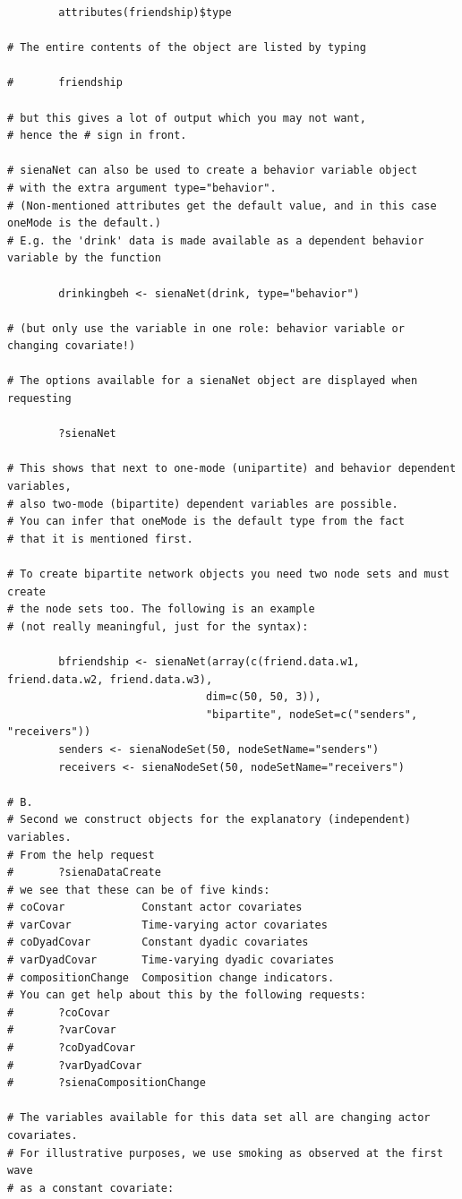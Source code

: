 \documentclass[a4paper,fleqn]{article}
\newcommand{\+}{\, + \,}
\begin{document}
{\begin{verbatim}
        attributes(friendship)$type

# The entire contents of the object are listed by typing

#       friendship

# but this gives a lot of output which you may not want,
# hence the # sign in front.

# sienaNet can also be used to create a behavior variable object
# with the extra argument type="behavior".
# (Non-mentioned attributes get the default value, and in this case oneMode is the default.)
# E.g. the 'drink' data is made available as a dependent behavior variable by the function

        drinkingbeh <- sienaNet(drink, type="behavior")

# (but only use the variable in one role: behavior variable or changing covariate!)

# The options available for a sienaNet object are displayed when requesting

        ?sienaNet

# This shows that next to one-mode (unipartite) and behavior dependent variables,
# also two-mode (bipartite) dependent variables are possible.
# You can infer that oneMode is the default type from the fact
# that it is mentioned first.

# To create bipartite network objects you need two node sets and must create
# the node sets too. The following is an example
# (not really meaningful, just for the syntax):

        bfriendship <- sienaNet(array(c(friend.data.w1, friend.data.w2, friend.data.w3),
                               dim=c(50, 50, 3)),
                               "bipartite", nodeSet=c("senders", "receivers"))
        senders <- sienaNodeSet(50, nodeSetName="senders")
        receivers <- sienaNodeSet(50, nodeSetName="receivers")

# B.
# Second we construct objects for the explanatory (independent) variables.
# From the help request
#       ?sienaDataCreate
# we see that these can be of five kinds:
# coCovar            Constant actor covariates
# varCovar           Time-varying actor covariates
# coDyadCovar        Constant dyadic covariates
# varDyadCovar       Time-varying dyadic covariates
# compositionChange  Composition change indicators.
# You can get help about this by the following requests:
#       ?coCovar
#       ?varCovar
#       ?coDyadCovar
#       ?varDyadCovar
#       ?sienaCompositionChange

# The variables available for this data set all are changing actor covariates.
# For illustrative purposes, we use smoking as observed at the first wave
# as a constant covariate:


\end{verbatim}}
\end{document}
